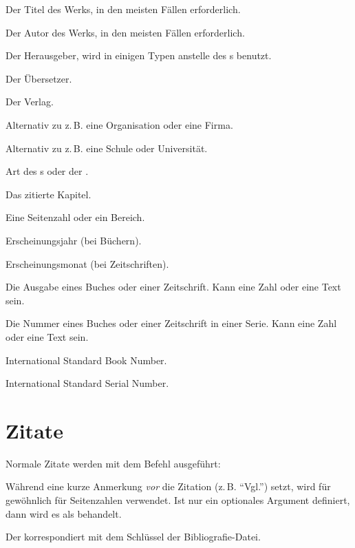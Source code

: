 \begin{labeling}{}
\item[\meta{title}]       Der Titel des Werks, in den meisten Fällen erforderlich.
\item[\meta{author}]      Der Autor des Werks, in den meisten Fällen erforderlich.
\item[\meta{editor}]      Der Herausgeber, wird in einigen Typen anstelle des s benutzt.
\item[\meta{translator}]  Der Übersetzer.
\item[\meta{publisher}]   Der Verlag.
\item[\meta{organization}] Alternativ zu  z.\,B. eine Organisation oder eine Firma.
\item[\meta{institution}] Alternativ zu  z.\,B. eine Schule oder Universität.
\item[\meta{type}]        Art des s oder der .
%
\item[\meta{chapter}]     Das zitierte Kapitel.
\item[\meta{pages}]       Eine Seitenzahl oder ein Bereich.
%
\item[\meta{year}]        Erscheinungsjahr (bei Büchern).
\item[\meta{month}]       Erscheinungsmonat (bei Zeitschriften).
\item[\meta{issue}]       Die Ausgabe eines Buches oder einer Zeitschrift.
        Kann eine Zahl oder eine Text sein.
\item[\meta{number}]      Die Nummer eines Buches oder einer Zeitschrift in einer Serie.
        Kann eine Zahl oder eine Text sein.
%
\item[\meta{isbn}]  International Standard Book Number. 
\item[\meta{issn}]  International Standard Serial Number. 
\end{labeling}

\section{Zitate}\label{sec:zitate}\label{lit:cite-befehle}

Normale Zitate werden mit dem Befehl  ausgeführt:

Während   eine kurze Anmerkung \emph{vor} die Zitation (z.\,B. \enquote{Vgl.}) setzt, 
wird   für gewöhnlich für Seitenzahlen verwendet.
Ist nur ein optionales Argument definiert, 
dann wird es als  behandelt.
Der  korrespondiert mit dem Schlüssel der Bibliografie-Datei.


